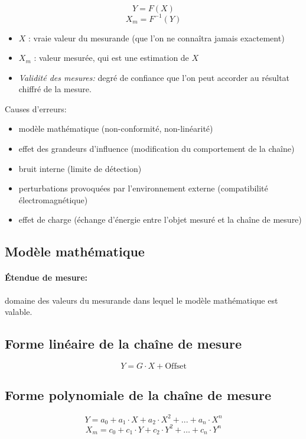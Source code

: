 \documentclass[10pt]{article} %
\begin{document}
\begin{multicols}{3}
\begin{flushleft}
			\[Y = F(X)\]
			\[X_m=F^{-1}(Y)\]
			
			\begin{itemize}
				\item $X$ : vraie valeur du mesurande (que l'on ne connaîtra jamais exactement)
				\item $X_m$ : valeur mesurée, qui est une estimation de $X$
				\item \emph{Validité des mesures:} degré de confiance que l'on peut accorder au résultat chiffré de la mesure.
			\end{itemize}
			
			Causes d'erreurs:
		
			\begin{itemize}
				\item modèle mathématique (non-conformité, non-linéarité)
				\item effet des grandeurs d'influence (modification du comportement de la chaîne)
				\item bruit interne (limite de détection)
				\item perturbations provoquées par l'environnement externe (compatibilité électromagnétique)
				\item effet de charge (échange d'énergie entre l'objet mesuré et la chaîne de mesure)
			\end{itemize}
			
		\subsection*{Modèle mathématique}
			
			\paragraph{Étendue de mesure:} domaine des valeurs du mesurande dans lequel le modèle mathématique est valable.
			
		\subsection*{Forme linéaire de la chaîne de mesure}
		
			\[Y = G \cdot X + \text{Offset}\]
			
		\subsection*{Forme polynomiale de la chaîne de mesure}
		
			\[Y=a_0+a_1\cdot X+a_2\cdot X^2+...+a_n\cdot X^n\]
			\[X_{m}=c_{0}+c_{1} \cdot Y+c_{2} \cdot Y^{2}+\ldots+c_{n} \cdot Y^{n}\]
			

\end{flushleft}
\end{multicols}
\end{document}
